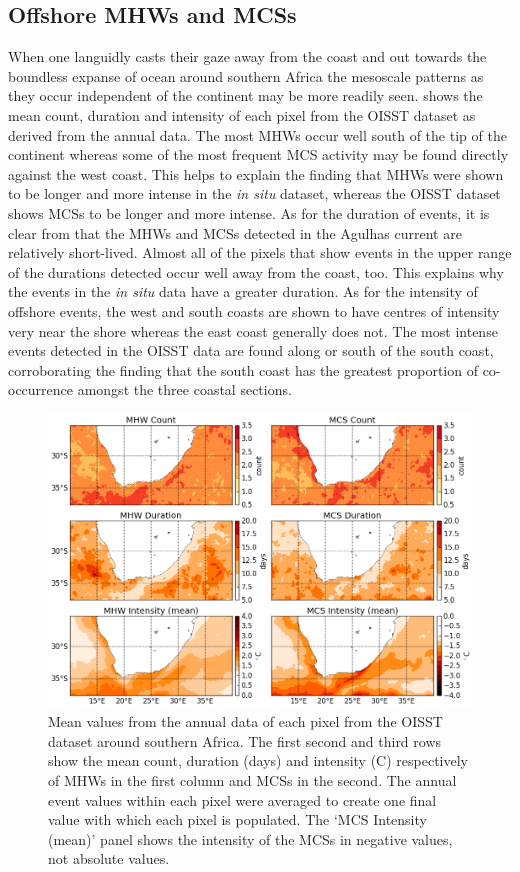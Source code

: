 \documentclass[a4paper,10pt,review]{elsarticle}
\begin{document}
\subsection{Offshore MHWs and MCSs}
When one languidly casts their gaze away from the coast and out towards the boundless expanse of ocean around southern Africa the mesoscale patterns as they occur independent of the continent may be more readily seen.  shows the mean count, duration and intensity of each pixel from the OISST dataset as derived from the annual data. The most MHWs occur well south of the tip of the continent whereas some of the most frequent MCS activity may be found directly against the west coast. This helps to explain the finding that MHWs were shown to be longer and more intense in the \emph{in situ} dataset, whereas the OISST dataset shows MCSs to be longer and more intense. As for the duration of events, it is clear from  that the MHWs and MCSs detected in the Agulhas current are relatively short-lived. Almost all of the pixels that show events in the upper range of the durations detected occur well away from the coast, too. This explains why the events in the \emph{in situ} data have a greater duration. As for the intensity of offshore events, the west and south coasts are shown to have centres of intensity very near the shore whereas the east coast generally does not. The most intense events detected in the OISST data are found along or south of the south coast, corroborating the finding that the south coast has the greatest proportion of co-occurrence amongst the three coastal sections.

\begin{figure}
\centering \includegraphics[width=1.0\textwidth]{MHW_MCS_mean.png}
\caption{Mean values from the annual data of each pixel from the OISST dataset around southern Africa. The first second and third rows show the mean count, duration (days) and intensity (\degree C) respectively of MHWs in the first column and MCSs in the second. The annual event values within each pixel were averaged to create one final value with which each pixel is populated. The `MCS Intensity (mean)' panel shows the intensity of the MCSs in negative values, not absolute values.}
\label{fig:Figure6}
\end{figure}
\end{document}

